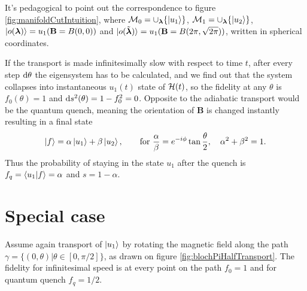 It's pedagogical to point out the correspondence to figure \ref{fig:manifoldCutIntuition}, where $\mathcal{M}_0=\cup_{\bm\lambda} \{\ket{u_1}\}$,  $\mathcal{M}_1=\cup_{\bm\lambda} \{\ket{u_2}\}$, $\ket{o({\bm\lambda})}=u_1(\mathbf B=B(0,0))$ and $\ket{o(\tilde{{\bm\lambda}})}=u_1(\mathbf B=B(2\pi,\sqrt{2\pi}))$, written in spherical coordinates.


If the transport is made infinitesimally slow with respect to time $t$, after every step $\mathrm{d} \theta$ the eigensystem has to be calculated, and we find out that the system collapses into instantaneous $u_1(t)$ state of $\mathcal{H}(t)$, so the fidelity at any $\theta$ is $f_0(\theta)=1$ and $\mathrm{d} s^2(\theta)=1-f_0^2=0$. Opposite to the adiabatic transport would be the quantum quench, meaning the orientation of $\mathbf B$ is changed instantly resulting in a final state 
\begin{equation}
   \ket{f} = \alpha \ket{u_1} + \beta \ket{u_2}, \qquad\text{for } \frac{\alpha}{\beta}=e^{-i\phi}\tan\frac{\theta}{2},\quad \alpha^2+\beta^2=1.
\end{equation}
Thus the probability of staying in the state $u_1$ after the quench is $f_q=\braket{u_1|f}=\alpha$ and $s=1-\alpha$.

\section{Special case}
Assume again transport of $\ket{u_1}$ by rotating the magnetic field along the path $\gamma=\{(0,\theta)|\theta\in[0,\pi/2]\}$, as drawn on figure \ref{fig:blochPiHalfTransport}. The fidelity for infinitesimal speed is at every point on the path $f_0=1$ and for quantum quench $f_q=1/2$.

